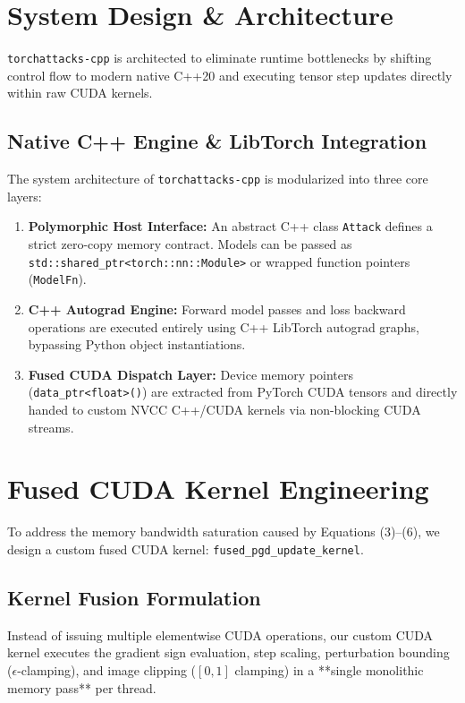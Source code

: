 \documentclass[11pt,onecolumn,a4paper]{article}
\begin{document}
\section{System Design \& Architecture}

\texttt{torchattacks-cpp} is architected to eliminate runtime bottlenecks by shifting control flow to modern native C++20 and executing tensor step updates directly within raw CUDA kernels.

\subsection{Native C++ Engine & LibTorch Integration}
The system architecture of \texttt{torchattacks-cpp} is modularized into three core layers:
\begin{enumerate}
    \item \textbf{Polymorphic Host Interface:} An abstract C++ class \texttt{Attack} defines a strict zero-copy memory contract. Models can be passed as \texttt{std::shared\_ptr<torch::nn::Module>} or wrapped function pointers (\texttt{ModelFn}).
    \item \textbf{C++ Autograd Engine:} Forward model passes and loss backward operations are executed entirely using C++ LibTorch autograd graphs, bypassing Python object instantiations.
    \item \textbf{Fused CUDA Dispatch Layer:} Device memory pointers (\texttt{data\_ptr<float>()}) are extracted from PyTorch CUDA tensors and directly handed to custom NVCC C++/CUDA kernels via non-blocking CUDA streams.
\end{enumerate}

\section{Fused CUDA Kernel Engineering}

To address the memory bandwidth saturation caused by Equations (3)--(6), we design a custom fused CUDA kernel: \texttt{fused\_pgd\_update\_kernel}.

\subsection{Kernel Fusion Formulation}
Instead of issuing multiple elementwise CUDA operations, our custom CUDA kernel executes the gradient sign evaluation, step scaling, perturbation bounding ($\epsilon$-clamping), and image clipping ($[0,1]$ clamping) in a **single monolithic memory pass** per thread.
\end{document}
